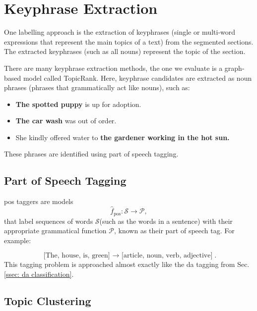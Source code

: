     \section{Keyphrase Extraction \label{ssec: keyphrase extraction}}
    One labelling approach is the extraction of \glspl{keyphrase} (single or multi-word expressions that represent the main topics of a text) from the segmented sections\cite{hasan2014automatic}. The extracted \glspl{keyphrase} (such as all nouns) represent the topic of the section.
    
    There are many \gls{keyphrase} extraction methods, the one we evaluate is a graph-based model called TopicRank\cite{bougouin-etal-2013-topicrank}. Here, \gls{keyphrase} candidates are extracted as noun phrases (phrases that grammatically act like nouns), such as:
    
    \begin{itemize}
        \item \textbf{The spotted puppy} is up for adoption.
        \item \textbf{The car wash} was out of order.
        \item She kindly offered water to \textbf{the gardener working in the hot sun.}
    \end{itemize}
    
    These phrases are identified using part of speech tagging.
        \subsection{Part of Speech Tagging \label{sssec: POS tagging}}
        
        \Gls{pos} taggers are models 
        \begin{equation}
          \hat{f}_{\text{pos}}: \mathcal{S} \rightarrow \mathcal{P},
        \end{equation} 
        that label sequences of words $\mathcal{S}$(such as the words in a sentence) with their appropriate grammatical function $\mathcal{P}$, known as their part of speech tag. For example:
        
        \begin{equation*}
        \text{[The, house, is, green] $\rightarrow$ [article, noun, verb, adjective]}.
        \end{equation*}
        This tagging problem is approached almost exactly like the \gls{da} tagging from Sec. \ref{ssec: da classification}.
        
        
        \subsection{Topic Clustering}
        
